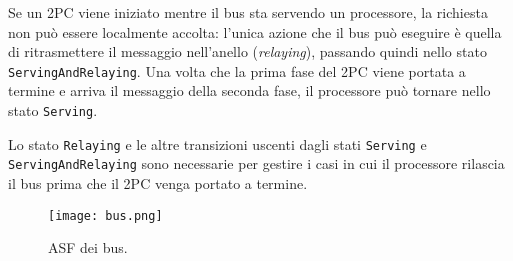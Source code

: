 Se un 2PC viene iniziato mentre il bus sta servendo un processore, la richiesta non può essere localmente accolta: l'unica azione che il bus può eseguire è quella di ritrasmettere il messaggio nell'anello (\textit{relaying}), passando quindi nello stato \texttt{ServingAndRelaying}. Una volta che la prima fase del 2PC viene portata a termine e arriva il messaggio della seconda fase, il processore può tornare nello stato \texttt{Serving}.

Lo stato \texttt{Relaying} e le altre transizioni uscenti dagli stati \texttt{Serving} e \texttt{\justify ServingAndRelaying} sono necessarie per gestire i casi in cui il processore rilascia il bus prima che il 2PC venga portato a termine.

\begin{figure}[t]
\vspace{-2cm}
\centerline{
	\texttt{[image: bus.png]}
}
\caption{ASF dei bus.}
\label{Fig:bus_fsm}
\end{figure}



